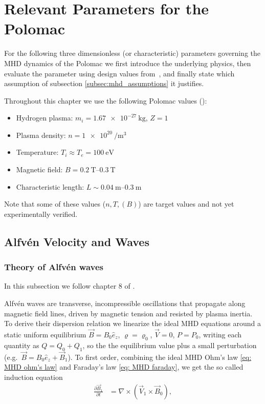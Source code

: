 
\chapter{Relevant Parameters for the Polomac}
\label{chap:parameters}

For the following three dimensionless (or characteristic) parameters governing the MHD
dynamics of the Polomac we first introduce the underlying
physics, then evaluate the parameter using design values
from~\cite{Elio2024}, and finally state which assumption of subsection \ref{subsec:mhd_assumptions} it justifies.

Throughout this chapter we use the following Polomac
values (\cite{Elio2024}):
\begin{itemize}
    \item Hydrogen plasma: $m_i = \SI{1.67e-27}{\kilogram}$, $Z = 1$
    \item Plasma density: $n = \SI{1e20}{\per\cubic\metre}$
    \item Temperature: $T_i \approx T_e = \SI{100}{\electronvolt}$
    \item Magnetic field: $B = \SIrange{0.2}{0.3}{\tesla}$
    \item Characteristic length: $L \sim \SIrange{0.04}{0.3}{\metre}$
\end{itemize}
Note that some of these values ($n, T, (B)$) are target values and not yet experimentally verified.



\section{Alfv\'en Velocity and Waves}
\label{sec:alfven}

\subsection{Theory of Alfv\'en waves}
\label{subsec: theory of alfven waves}

In this subsection we follow chapter 8 of \cite{Freidberg2014}.

Alfv\'en waves are transverse, incompressible oscillations that
propagate along magnetic field lines, driven by magnetic tension and
resisted by plasma inertia.  To derive their dispersion relation we
linearize the ideal MHD equations around a static uniform equilibrium
$\vec{B}=B_0\hat{e}_z$, $\varrho=\varrho_0$, $\vec{V}=0$,
$P=P_0$, writing each quantity as $Q = Q_0 + Q_1$, so the the equilibrium value plus a small
perturbation (e.g.\ $\vec{B}=B_0\hat{e}_z+\vec{B}_1$). To first
order, combining the ideal MHD Ohm's law \eqref{eq: MHD ohm's law} 
and Faraday's law \eqref{eq: MHD faraday}, we get the so called induction equation
\begin{align}
    \label{eq: alfven ind. eq}
    \frac{\partial\vec{B}_1}{\partial t}
        &= \nabla\times(\vec{V}_1\times\vec{B}_0), 
\end{align}

